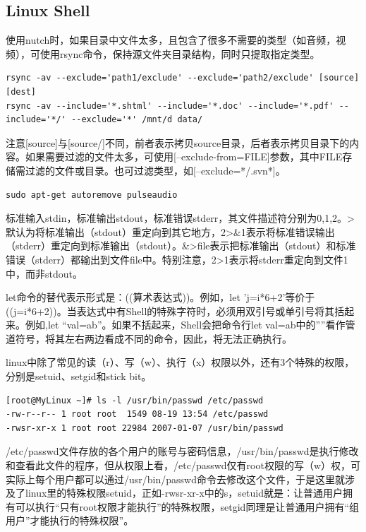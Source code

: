 \subsection{Linux Shell}
\par 使用nutch时，如果目录中文件太多，且包含了很多不需要的类型（如音频，视频），可使用rsync命令，保持源文件夹目录结构，同时只提取指定类型。
\begin{verbatim}
rsync -av --exclude='path1/exclude' --exclude='path2/exclude' [source] [dest]
rsync -av --include='*.shtml' --include='*.doc' --include='*.pdf' --include='*/' --exclude='*' /mnt/d data/
\end{verbatim}
\par 注意[source]与[source/]不同，前者表示拷贝source目录，后者表示拷贝目录下的内容。如果需要过滤的文件太多，可使用[--exclude-from=FILE]参数，其中FILE存储需过滤的文件或目录。也可过滤类型，如[--exclude=*/.svn*]。
\begin{verbatim}
sudo apt-get autoremove pulseaudio
\end{verbatim}
\par 标准输入stdin，标准输出stdout，标准错误stderr，其文件描述符分别为0,1,2。>默认为将标准输出（stdout）重定向到其它地方，2>\&1表示将标准错误输出（stderr）重定向到标准输出（stdout）。\&>file表示把标准输出（stdout）和标准错误（stderr）都输出到文件file中。特别注意，2>1表示将stderr重定向到文件1中，而非stdout。
\par let命令的替代表示形式是：((算术表达式))。例如，let 'j=i*6+2'等价于((j=i*6+2))。当表达式中有Shell的特殊字符时，必须用双引号或单引号将其括起来。例如,let ``val=a\textbar b''。如果不括起来，Shell会把命令行let val=a\textbar b中的''\textbar''看作管道符号，将其左右两边看成不同的命令，因此，将无法正确执行。 
\par linux中除了常见的读（r）、写（w）、执行（x）权限以外，还有3个特殊的权限，分别是setuid、setgid和stick bit。
\begin{verbatim}
[root@MyLinux ~]# ls -l /usr/bin/passwd /etc/passwd
-rw-r--r-- 1 root root  1549 08-19 13:54 /etc/passwd
-rwsr-xr-x 1 root root 22984 2007-01-07 /usr/bin/passwd
\end{verbatim}
\par /etc/passwd文件存放的各个用户的账号与密码信息，/usr/bin/passwd是执行修改和查看此文件的程序，但从权限上看，/etc/passwd仅有root权限的写（w）权，可实际上每个用户都可以通过/usr/bin/passwd命令去修改这个文件，于是这里就涉及了linux里的特殊权限setuid，正如-rwsr-xr-x中的s，setuid就是：让普通用户拥有可以执行“只有root权限才能执行”的特殊权限，setgid同理是让普通用户拥有“组用户”才能执行的特殊权限”。
